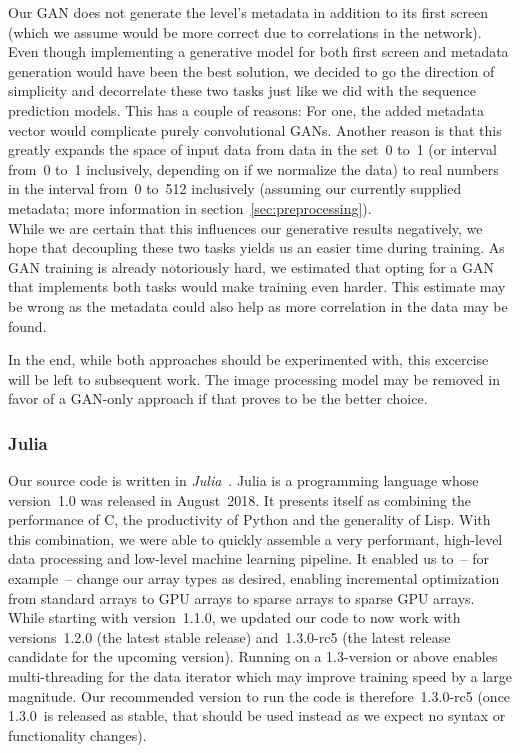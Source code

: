 Our GAN does not generate the level's metadata in addition to its
first screen (which we assume would be more correct due to
correlations in the network). Even though implementing a generative
model for both first screen and metadata generation would have been
the best solution, we decided to go the direction of simplicity and
decorrelate these two tasks just like we did with the sequence
prediction models. This has a couple of reasons: For one, the added
metadata vector would complicate purely convolutional GANs. Another
reason is that this greatly expands the space of input data from data
in the set~0 to~1 (or interval from~0 to~1 inclusively, depending on
if we normalize the data) to real numbers in the interval from~0
to~512 inclusively (assuming our currently supplied metadata; more
information in section~\ref{sec:preprocessing}). \\
While we are certain that this influences our generative results
negatively, we hope that decoupling these two tasks yields us an
easier time during training. As GAN training is already notoriously
hard, we estimated that opting for a GAN that implements both tasks
would make training even harder. This estimate may be wrong as the
metadata could also help as more correlation in the data may be found.

In the end, while both approaches should be experimented with, this
excercise will be left to subsequent work. The image processing model
may be removed in favor of a GAN-only approach if that proves to be
the better choice.

\subsubsection{Julia}
\label{sec:julia}

Our source code is written in
\emph{Julia}~\cite{bezansonJuliaFreshApproach2017}. Julia is a
programming language whose version~1.0 was released in August~2018. It
presents itself as combining the performance of C, the productivity of
Python and the generality of Lisp. With this combination, we were able
to quickly assemble a very performant, high-level data processing and
low-level machine learning pipeline. It enabled us to~-- for example~--
change our array types as desired, enabling incremental optimization
from standard arrays to GPU arrays to sparse arrays to sparse GPU
arrays. While starting with version~1.1.0, we updated our code to now
work with versions~1.2.0 (the latest stable release)
and~\mbox{1.3.0-rc5} (the latest release candidate for the upcoming
version). Running on a 1.3-version or above enables multi-threading
for the data iterator which may improve training speed by a large
magnitude. Our recommended version to run the code is
therefore~\mbox{1.3.0-rc5} (once 1.3.0~is released as stable, that
should be used instead as we expect no syntax or functionality
changes).

